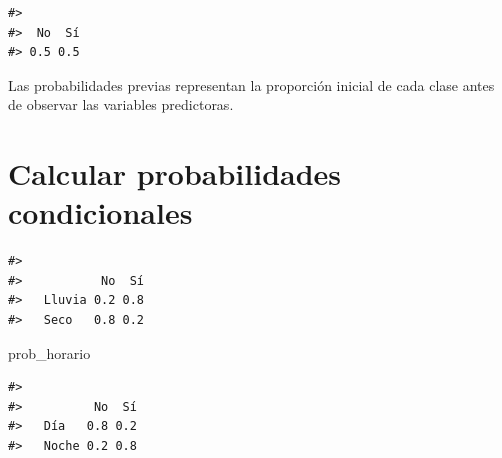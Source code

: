 \documentclass[
  spanish,
  10.5pt,
  letterpaper,
  openany,
  headings=big]{scrbook}
\newenvironment{Shaded}{}{}
\newcommand{\AttributeTok}[1]{\textcolor[rgb]{0.84,0.23,0.29}{#1}}
\newcommand{\DecValTok}[1]{\textcolor[rgb]{0.00,0.36,0.77}{#1}}
\newcommand{\FunctionTok}[1]{\textcolor[rgb]{0.44,0.26,0.76}{#1}}
\newcommand{\NormalTok}[1]{\textcolor[rgb]{0.14,0.16,0.18}{#1}}
\newcommand{\OtherTok}[1]{\textcolor[rgb]{0.44,0.26,0.76}{#1}}
\newcommand{\SpecialCharTok}[1]{\textcolor[rgb]{0.00,0.36,0.77}{#1}}
\begin{document}
\begin{Shaded}
\end{Shaded}

\begin{verbatim}
#> 
#>  No  Sí 
#> 0.5 0.5
\end{verbatim}

Las probabilidades previas representan la proporción inicial de cada
clase antes de observar las variables predictoras.

\section{Calcular probabilidades
condicionales}\label{calcular-probabilidades-condicionales}

\begin{Shaded}
\end{Shaded}

\begin{verbatim}
#>         
#>           No  Sí
#>   Lluvia 0.2 0.8
#>   Seco   0.8 0.2
\end{verbatim}

\begin{Shaded}
\begin{Highlighting}[]
\NormalTok{prob\_horario}
\end{Highlighting}
\end{Shaded}

\begin{verbatim}
#>        
#>          No  Sí
#>   Día   0.8 0.2
#>   Noche 0.2 0.8
\end{verbatim}
\end{document}
